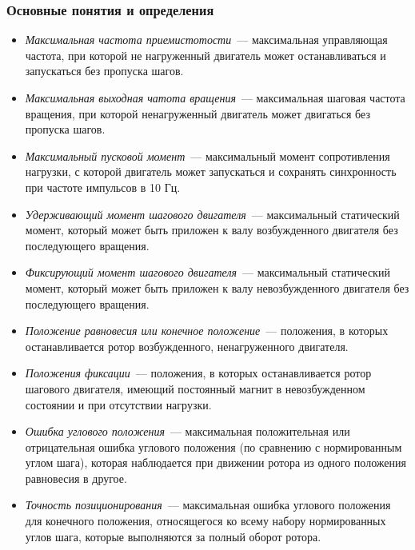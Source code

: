 \subsubsection{Основные понятия и определения}

\begin{itemize}
    \item \textit{Максимальная частота приемистотости}~--- максимальная
        управляющая частота, при которой не нагруженный двигатель может
        останавливаться и запускаться без пропуска шагов.

    \item \textit{Максимальная выходная чатота вращения}~--- максимальная
        шаговая частота вращения, при которой ненагруженный двигатель может
        двигаться без пропуска шагов.

    \item \textit{Максимальный пусковой момент}~--- максимальный момент
        сопротивления нагрузки, с которой двигатель может запускаться и
        сохранять синхронность при частоте импульсов в 10 Гц.

    \item \textit{Удерживающий момент шагового двигателя}~--- максимальный
        статический момент, который может быть приложен к валу возбужденного
        двигателя без последующего вращения.

    \item \textit{Фиксирующий момент шагового двигателя}~--- максимальный
        статический момент, который может быть приложен к валу невозбужденного
        двигателя без последующего вращения.

    \item \textit{Положение равновесия или конечное положение}~--- положения,
        в которых останавливается ротор возбужденного, ненагруженного двигателя.

    \item \textit{Положения фиксации}~--- положения, в которых останавливается
        ротор шагового двигателя, имеющий постоянный магнит в невозбужденном
        состоянии и при отсутствии нагрузки.

    \item \textit{Ошибка углового положения}~--- максимальная положительная или
        отрицательная ошибка углового положения (по сравнению с нормированным
        углом шага), которая наблюдается при движении ротора из одного положения
        равновесия в другое.

    \item \textit{Точность позиционирования}~--- максимальная ошибка углового
        положения для конечного положения, относящегося ко всему набору
        нормированных углов шага, которые выполняются за полный оборот ротора.


\end{itemize}
